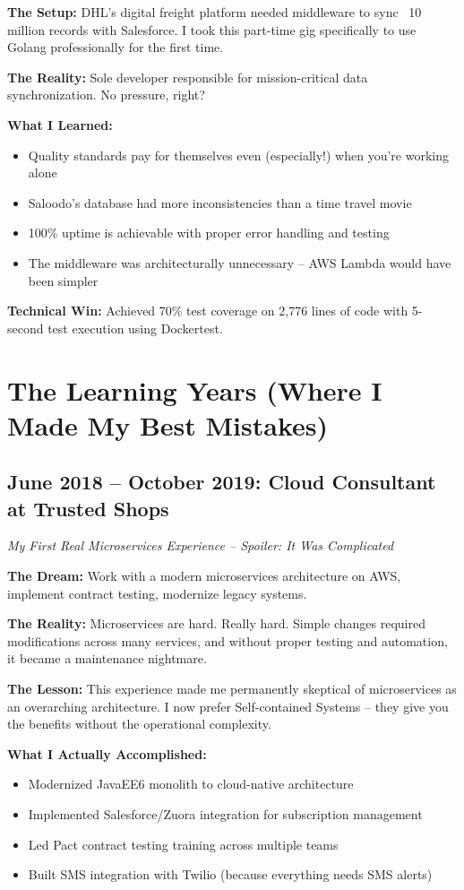 \documentclass[10pt,a4paper]{article}
\begin{document}
\textbf{The Setup:} DHL's digital freight platform needed middleware to sync ~10 million records with Salesforce. I took this part-time gig specifically to use Golang professionally for the first time.

\textbf{The Reality:} Sole developer responsible for mission-critical data synchronization. No pressure, right?

\textbf{What I Learned:}
\begin{itemize}
    \item Quality standards pay for themselves even (especially!) when you're working alone
    \item Saloodo's database had more inconsistencies than a time travel movie
    \item 100\% uptime is achievable with proper error handling and testing
    \item The middleware was architecturally unnecessary -- AWS Lambda would have been simpler
\end{itemize}

\textbf{Technical Win:} Achieved 70\% test coverage on 2,776 lines of code with 5-second test execution using Dockertest.

\section{The Learning Years (Where I Made My Best Mistakes)}

\subsection{June 2018 -- October 2019: Cloud Consultant at Trusted Shops}
\textit{My First Real Microservices Experience -- Spoiler: It Was Complicated}

\textbf{The Dream:} Work with a modern microservices architecture on AWS, implement contract testing, modernize legacy systems.

\textbf{The Reality:} Microservices are hard. Really hard. Simple changes required modifications across many services, and without proper testing and automation, it became a maintenance nightmare.

\textbf{The Lesson:} This experience made me permanently skeptical of microservices as an overarching architecture. I now prefer Self-contained Systems -- they give you the benefits without the operational complexity.

\textbf{What I Actually Accomplished:}
\begin{itemize}
    \item Modernized JavaEE6 monolith to cloud-native architecture
    \item Implemented Salesforce/Zuora integration for subscription management
    \item Led Pact contract testing training across multiple teams
    \item Built SMS integration with Twilio (because everything needs SMS alerts)
\end{itemize}
\end{document}
